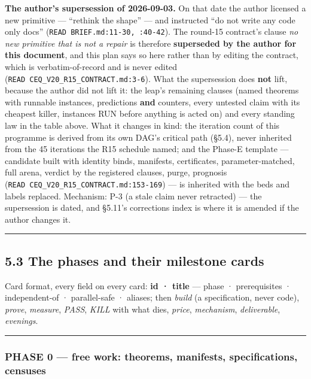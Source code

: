 \documentclass[11pt,a4paper]{article}
\theoremstyle{plain}
\theoremstyle{definition}
\theoremstyle{remark}
\begin{document}
\textbf{The author's supersession of 2026-09-03.} On that date the
author licensed a new primitive --- ``rethink the shape'' --- and
instructed ``do not write any code only docs''
(\texttt{READ\ BRIEF.md:11-30,\ :40-42}). The round-15 contract's clause
\emph{no new primitive that is not a repair} is therefore
\textbf{superseded by the author for this document}, and this plan says
so here rather than by editing the contract, which is verbatim-of-record
and is never edited (\texttt{READ\ CEQ\_V20\_R15\_CONTRACT.md:3-6}).
What the supersession does \textbf{not} lift, because the author did not
lift it: the leap's remaining clauses (named theorems with runnable
instances, predictions \textbf{and} counters, every untested claim with
its cheapest killer, instances RUN before anything is acted on) and
every standing law in the table above. What it changes in kind: the
iteration count of this programme is derived from its own DAG's critical
path (§5.4), never inherited from the 45 iterations the R15 schedule
named; and the Phase-E template --- candidate built with identity binds,
manifests, certificates, parameter-matched, full arena, verdict by the
registered clauses, purge, prognosis
(\texttt{READ\ CEQ\_V20\_R15\_CONTRACT.md:153-169}) --- is inherited
with the beds and labels replaced. Mechanism: P-3 (a stale claim never
retracted) --- the supersession is dated, and §5.11's corrections index
is where it is amended if the author changes it.

\begin{center}\rule{0.5\linewidth}{0.5pt}\end{center}

\subsection{5.3 The phases and their milestone
cards}\label{the-phases-and-their-milestone-cards}

Card format, every field on every card: \textbf{id · title} --- phase ·
prerequisites · independent-of · parallel-safe · aliases; then
\emph{build} (a specification, never code), \emph{prove},
\emph{measure}, \emph{PASS}, \emph{KILL} with what dies, \emph{price},
\emph{mechanism}, \emph{deliverable}, \emph{evenings}.

\begin{center}\rule{0.5\linewidth}{0.5pt}\end{center}

\subsubsection{PHASE 0 --- free work: theorems, manifests,
specifications,
censuses}\label{phase-0-free-work-theorems-manifests-specifications-censuses}
\end{document}
